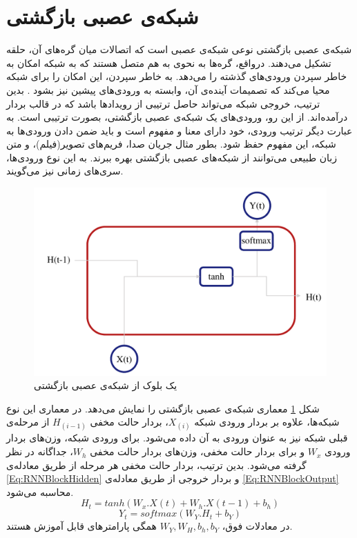 \section{شبکه‌ی عصبی بازگشتی}
شبکه‌ی عصبی بازگشتی نوعی شبکه‌ی عصبی است که اتصالات میان گره‌های آن، حلقه تشکیل می‌دهند. درواقع، گره‌ها به نحوی به هم متصل هستند که به شبکه امکان به خاطر سپردن ورودی‌های گذشته را می‌دهد. به خاطر سپردن، این امکان را برای شبکه محیا می‌کند که تصمیمات آینده‌ی آن، وابسته به ورودی‌های پیشین نیز بشود \cite{rnn}. بدین ترتیب، خروجی شبکه می‌تواند حاصل ترتیبی از رویدادها باشد که در قالب بردار درآمده‌اند. از این رو، ورودی‌های یک شبکه‌ی عصبی بازگشتی، بصورت ترتیبی است. به عبارت دیگر ترتیب ورودی، خود دارای معنا و مفهوم است و باید ضمن دادن ورودی‌ها به شبکه، این مفهوم حفظ شود. بطور مثال جریان صدا، فریم‌های تصویر(فیلم)، و متن زبان طبیعی می‌توانند از شبکه‌های عصبی بازگشتی بهره ببرند. به این نوع ورودی‌ها، سری‌های زمانی نیز می‌گویند.
 \begin{figure}[!htb]
	\centering
	\includegraphics[scale=0.6]{Figures/RNN.pdf}
	\caption{یک بلوک از شبکه‌ی عصبی بازگشتی}
	\label{Fig:RNNBlock}
\end{figure}

شکل \ref{Fig:RNNBlock} معماری شبکه‌ی عصبی بازگشتی را نمایش می‌دهد. در معماری این نوع شبکه‌ها، علاوه بر بردار ورودی شبکه $X_{(i)}$، بردار حالت مخفی $H_{(i-1)}$  از مرحله‌ی قبلی شبکه نیز به عنوان ورودی به آن داده می‌شود. برای ورودی شبکه، وزن‌های بردار ورودی $W_{x}$ و برای بردار حالت مخفی، وزن‌های بردار حالت مخفی $W_{h}$، جداگانه در نظر گرفته می‌شود. بدین ترتیب، بردار حالت مخفی هر مرحله از طریق معادله‌ی \ref{Eq:RNNBlockHidden} و بردار خروجی از طریق معادله‌ی \ref{Eq:RNNBlockOutput} محاسبه می‌شود.
\begin{equation}
	H_{t} = tanh(W_{x}.X(t) + W_{h}.X(t-1) + b_{h})
	\label{Eq:RNNBlockHidden}
\end{equation}\vspace{-\baselineskip}
\begin{equation}
	Y_{t} = softmax(W_{Y}.H_{t} + b_{Y})
	\label{Eq:RNNBlockOutput}
\end{equation}
در معادلات فوق، $W_{Y}, W_{H}, b_{h}, b_{Y}$ همگی پارامترهای قابل آموزش هستند.


